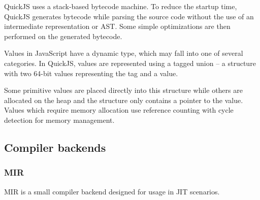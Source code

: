 QuickJS uses a stack-based bytecode machine. To reduce the startup time, QuickJS generates bytecode while parsing the source code without the use of an intermediate representation or AST. Some simple optimizations are then performed on the generated bytecode.

Values in JavaScript have a dynamic type, which may fall into one of several categories. In QuickJS, values are represented using a tagged union -- a structure with two 64-bit values representing the tag and a value.

Some primitive values are placed directly into this structure while others are allocated on the heap and the structure only contains a pointer to the value. Values which require memory allocation use reference counting with cycle detection for memory management.



\subsection{Compiler backends}


\subsubsection{MIR}

MIR is a small compiler backend designed for usage in JIT scenarios.
